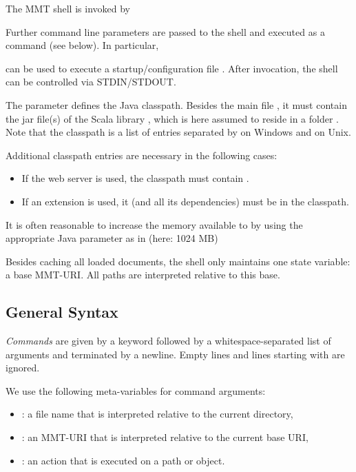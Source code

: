 The MMT shell is invoked by
\begin{center}
\end{center}
Further command line parameters are passed to the shell and executed as a command (see below). In particular,
\begin{center}
\end{center}
can be used to execute a startup/configuration file . After invocation, the shell can be controlled via STDIN/STDOUT.

The  parameter defines the Java classpath. Besides the main file , it must contain the jar file(s) of the Scala library \cite{scala}, which is here assumed to reside in a folder . Note that the classpath is a list of entries separated by \code{;} on Windows and \code{:} on Unix.

Additional classpath entries are necessary in the following cases:
\begin{itemize}
\item If the {\mmt} web server is used, the classpath must contain  \cite{tiscaf}.
\item If an {\mmt} extension is used, it (and all its dependencies) must be in the classpath.
\end{itemize}

It is often reasonable to increase the memory available to {\mmt} by using the appropriate Java parameter as in (here: 1024 MB) 
\begin{center}
\end{center}

Besides caching all loaded documents, the shell only maintains one state variable: a base MMT-URI. All paths are interpreted relative to this base.

\subsection{General Syntax}
\emph{Commands} are given by a keyword followed by a whitespace-separated list of arguments and terminated by a newline. Empty lines and lines starting with \code{//} are ignored.

We use the following meta-variables for command arguments:
\begin{itemize}
	\item {}: a file name that is interpreted relative to the current directory,
	\item {}: an MMT-URI that is interpreted relative to the current base URI,
	\item {}: an action that is executed on a path or object.
\end{itemize}

